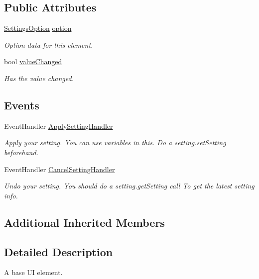 \subsection*{Public Attributes}
\begin{DoxyCompactItemize}
\item 
\hyperlink{struct_settings_option}{Settings\+Option} \hyperlink{class_base_settings_element_a2c1c435ddeb8bba562b2eaed7de48f9a}{option}
\begin{DoxyCompactList}\small\item\em Option data for this element. \end{DoxyCompactList}\item 
bool \hyperlink{class_base_settings_element_a111dc3010c4c6b94b57cb41f44e48f86}{value\+Changed}
\begin{DoxyCompactList}\small\item\em Has the value changed. \end{DoxyCompactList}\end{DoxyCompactItemize}
\subsection*{Events}
\begin{DoxyCompactItemize}
\item 
Event\+Handler \hyperlink{class_base_settings_element_a1a9087dc17efd4f2bae8444c42cdc06f}{Apply\+Setting\+Handler}
\begin{DoxyCompactList}\small\item\em Apply your setting. You can use variables in this. Do a setting.\+set\+Setting beforehand. \end{DoxyCompactList}\item 
Event\+Handler \hyperlink{class_base_settings_element_a17af6ca2e320db153814f56b2ca0f96c}{Cancel\+Setting\+Handler}
\begin{DoxyCompactList}\small\item\em Undo your setting. You should do a setting.\+get\+Setting call To get the latest setting info. \end{DoxyCompactList}\end{DoxyCompactItemize}
\subsection*{Additional Inherited Members}


\subsection{Detailed Description}
A base UI element. 



